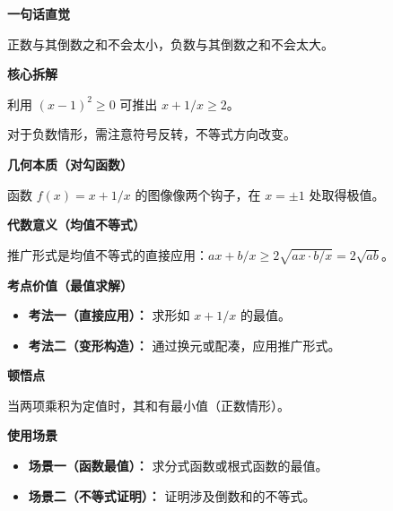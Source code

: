 \begin{explanationbox}
\textbf{\textcolor{CExplanation}{一句话直觉}}

正数与其倒数之和不会太小，负数与其倒数之和不会太大。

\medskip
\textbf{\textcolor{CExplanation}{核心拆解}}
\begin{description}[style=nextline, leftmargin=2.8em, labelsep=0.5em, itemsep=0.45em]
    \item[\textbf{要点一（平方非负）：}] 利用 $(x-1)^2 \geq 0$ 可推出 $x + 1/x \geq 2$。
    \item[\textbf{要点二（分类讨论）：}] 对于负数情形，需注意符号反转，不等式方向改变。
\end{description}

\medskip
\textbf{\textcolor{CExplanation}{几何本质（对勾函数）}}

函数 $f(x)=x+1/x$ 的图像像两个钩子，在 $x=\pm1$ 处取得极值。

\medskip
\textbf{\textcolor{CExplanation}{代数意义（均值不等式）}}

推广形式是均值不等式的直接应用：$ax + b/x \geq 2\sqrt{ax \cdot b/x} = 2\sqrt{ab}$。

\medskip
\textbf{\textcolor{CExplanation}{考点价值（最值求解）}}
\begin{itemize}[leftmargin=*, itemsep=0.5em, topsep=0.4em]
    \item \textbf{考法一（直接应用）：} 求形如 $x+1/x$ 的最值。
    \item \textbf{考法二（变形构造）：} 通过换元或配凑，应用推广形式。
\end{itemize}

\medskip
\textbf{\textcolor{CExplanation}{顿悟点}}

当两项乘积为定值时，其和有最小值（正数情形）。

\medskip
\textbf{\textcolor{CExplanation}{使用场景}}
\begin{itemize}[leftmargin=*, itemsep=0.5em, topsep=0.4em]
    \item \textbf{场景一（函数最值）：} 求分式函数或根式函数的最值。
    \item \textbf{场景二（不等式证明）：} 证明涉及倒数和的不等式。
\end{itemize}
\end{explanationbox}
